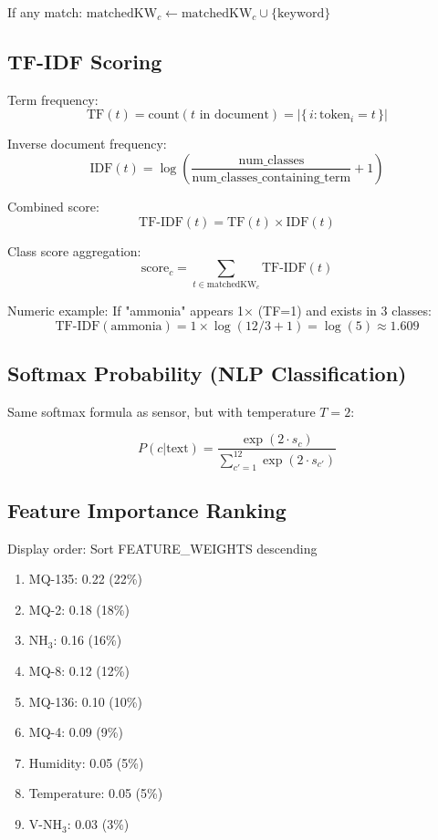 \documentclass[12pt,a4paper]{article}
\begin{document}
If any match: $\text{matchedKW}_c \gets \text{matchedKW}_c \cup \{\text{keyword}\}$

\subsection{TF-IDF Scoring}

Term frequency:
$$\text{TF}(t) = \text{count}(t \text{ in document}) = |\{\, i : \text{token}_i = t \,\}|$$

Inverse document frequency:
$$\text{IDF}(t) = \log\left(\frac{\text{num\_classes}}{\text{num\_classes\_containing\_term}} + 1\right)$$

Combined score:
$$\text{TF-IDF}(t) = \text{TF}(t) \times \text{IDF}(t)$$

Class score aggregation:
$$\text{score}_c = \sum_{t \in \text{matchedKW}_c} \text{TF-IDF}(t)$$

Numeric example: If "ammonia" appears 1× (TF=1) and exists in 3 classes:
$$\text{TF-IDF}(\text{ammonia}) = 1 \times \log(12/3 + 1) = \log(5) \approx 1.609$$

\subsection{Softmax Probability (NLP Classification)}

Same softmax formula as sensor, but with temperature $T = 2$:

$$P(c|\text{text}) = \frac{\exp(2 \cdot s_c)}{\sum_{c'=1}^{12} \exp(2 \cdot s_{c'})}$$

\subsection{Feature Importance Ranking}

Display order: Sort FEATURE\_WEIGHTS descending

\begin{enumerate}
    \item MQ-135: 0.22 (22\%)
    \item MQ-2: 0.18 (18\%)
    \item NH$_3$: 0.16 (16\%)
    \item MQ-8: 0.12 (12\%)
    \item MQ-136: 0.10 (10\%)
    \item MQ-4: 0.09 (9\%)
    \item Humidity: 0.05 (5\%)
    \item Temperature: 0.05 (5\%)
    \item V-NH$_3$: 0.03 (3\%)
\end{enumerate}
\end{document}
